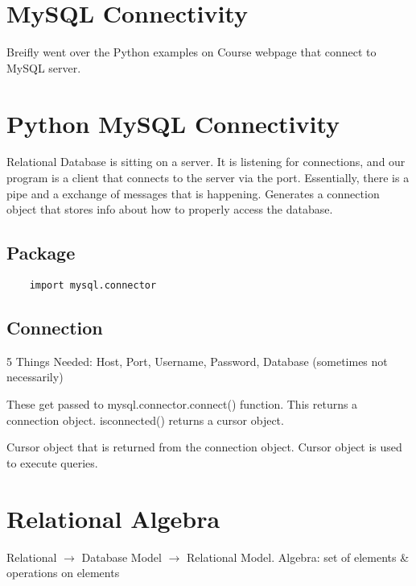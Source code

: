 \documentclass[twoside]{article}
\begin{document}
\section*{MySQL Connectivity}
Breifly went over the Python examples on Course webpage that connect to 
MySQL server.

\newpage
\hfill \break 
{}

\section*{Python MySQL Connectivity}
Relational Database is sitting on a server. It is listening
for connections, and our program is a client that connects
to the server via the port. Essentially, there is a pipe and a
exchange of messages that is happening. Generates a connection object
that stores info about how to properly access the database.

\subsection*{Package}
\begin{verbatim}
    import mysql.connector
\end{verbatim}

\subsection*{Connection}
5 Things Needed: Host, Port, Username, Password, Database (sometimes not 
necessarily)

These get passed to mysql.connector.connect() function. This returns a 
connection object.
is\textunderscore connected() returns a cursor object.

Cursor object that is returned from the connection object. Cursor object is 
used to execute queries.


\section*{Relational Algebra}
Relational $\longrightarrow$ Database Model $\longrightarrow$ Relational Model.
Algebra: set of elements \& operations on elements
\end{document}
